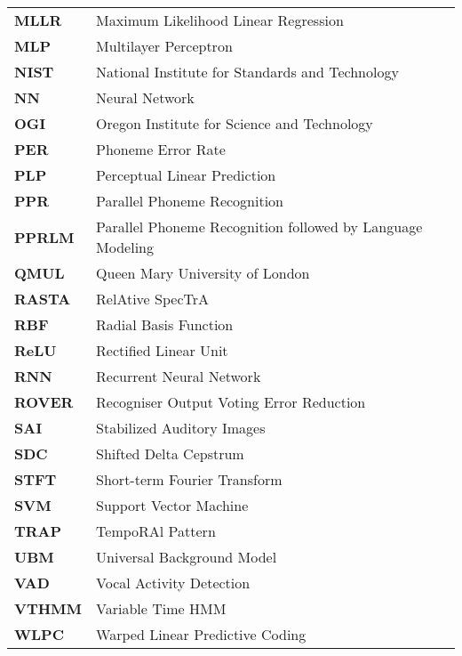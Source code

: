\begin{longtable}{p{} p{}}
\textbf{MLLR} & Maximum Likelihood Linear Regression\\
\textbf{MLP} & Multilayer Perceptron\\
\textbf{NIST} & National Institute for Standards and Technology\\
\textbf{NN} & Neural Network\\
\textbf{OGI} & Oregon Institute for Science and Technology\\
\textbf{PER} & Phoneme Error Rate\\
\textbf{PLP} & Perceptual Linear Prediction\\
\textbf{PPR} & Parallel Phoneme Recognition\\
\textbf{PPRLM} & Parallel Phoneme Recognition followed by Language Modeling\\
\textbf{QMUL} & Queen Mary University of London\\
\textbf{RASTA} & RelAtive SpecTrA\\
\textbf{RBF} & Radial Basis Function\\
\textbf{ReLU} & Rectified Linear Unit\\
\textbf{RNN} & Recurrent Neural Network\\
\textbf{ROVER} & Recogniser Output Voting Error Reduction\\
\textbf{SAI} & Stabilized Auditory Images\\
\textbf{SDC} & Shifted Delta Cepstrum\\
\textbf{STFT} & Short-term Fourier Transform\\
\textbf{SVM} & Support Vector Machine\\
\textbf{TRAP} & TempoRAl Pattern\\
\textbf{UBM} & Universal Background Model\\
\textbf{VAD} & Vocal Activity Detection\\
\textbf{VTHMM} & Variable Time HMM\\
\textbf{WLPC} & Warped Linear Predictive Coding\\

\end{longtable}
